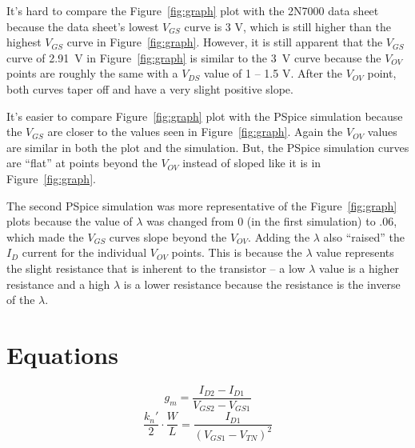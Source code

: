 It’s hard to compare the Figure~\ref{fig:graph} plot with the 2N7000 data sheet because the data sheet’s lowest $V_{GS}$ curve is 3 V, which is still higher than the highest $V_{GS}$ curve in Figure~\ref{fig:graph}. However, it is still apparent that the $V_{GS}$ curve of \SI{2.91}{V} in Figure~\ref{fig:graph} is similar to the \SI{3}{V} curve because the $V_{OV}$ points are roughly the same with a $V_{DS}$ value of 1 – 1.5 V. After the $V_{OV}$ point, both curves taper off and have a very slight positive slope.

It’s easier to compare Figure~\ref{fig:graph} plot with the PSpice simulation because the $V_{GS}$ are closer to the values seen in Figure~\ref{fig:graph}. Again the $V_{OV}$ values are similar in both the plot and the simulation. But, the PSpice simulation curves are “flat” at points beyond the $V_{OV}$ instead of sloped like it is in Figure~\ref{fig:graph}.

The second PSpice simulation was more representative of the Figure~\ref{fig:graph} plots because the value of $\lambda$ was changed from 0 (in the first simulation) to .06, which made the $V_{GS}$ curves slope beyond the $V_{OV}$. Adding the $\lambda$ also “raised” the $I_D$ current for the individual $V_{OV}$ points. This is because the $\lambda$ value represents the slight resistance that is inherent to the transistor – a low $\lambda$ value is a higher resistance and a high $\lambda$ is a lower resistance because the resistance is the inverse of the $\lambda$.

\section{Equations}
\label{sec:equations}

%
\begin{equation}
  \label{eq:transconduct}
  g_m = \frac{I_{D2}-I_{D1}}{V_{GS2}-V_{GS1}}
\end{equation}
%
\begin{equation}
  \label{eq:phys}
  \frac{k_n'}{2} \cdot \frac{W}{L} = \frac{I_{D1}}{(V_{GS1} - V_{TN})^2}
\end{equation}


